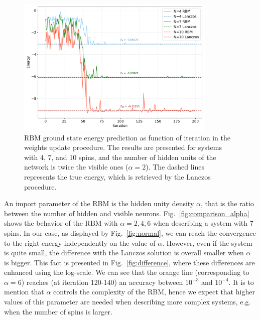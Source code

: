 \documentclass[a4paper,11pt]{article}
\begin{document}
\begin{figure}[htb]
  \centering    
  \caption{RBM ground state energy prediction as function of iteration in the weights update procedure. The results are presented for systems with 4, 7, and 10 spins, and the number of hidden units of the network is twice the visible ones ($\alpha=2$). The dashed lines represents the true energy, which is retrieved by the Lanczos procedure.}
  \label{fig:comparison_N}
  \includegraphics[width=0.85\textwidth]{./figure/Comparison_different_N.pdf}
\end{figure}

An import parameter of the RBM is the hidden unity density $\alpha$, that is the ratio between the number of hidden and visible neurons. Fig.~\ref{fig:comparison_alpha} shows the behavior of the RBM with $\alpha=2,4,6$ when describing a system with 7 spins. In our case, as displayed by Fig.~\ref{fig:normal}, we can reach the convergence to the right energy independently on the value of $\alpha$. However, even if the system is quite small, the difference with the Lanczos solution is overall smaller when $\alpha$ is bigger. This fact is presented in Fig.~\ref{fig:difference}, where these differences are enhanced using the log-scale. We can see that the orange line (corresponding to $\alpha=6$) reaches (at iteration 120-140) an accuracy between $10^{-3}$ and $10^{-4}$. It is to mention that $\alpha$ controls the complexity of the RBM, hence we expect that higher values of this parameter are needed when describing more complex systems, e.g. when the number of spins is larger.
\end{document}
